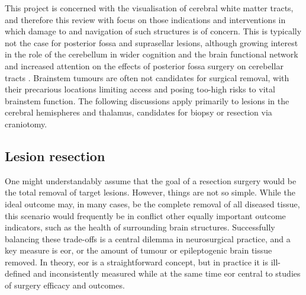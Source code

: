 This project is concerned with the visualisation of cerebral white matter tracts, and therefore this review with focus on those indications and interventions in which damage to and navigation of such structures is of concern.
This is typically not the case for posterior fossa and suprasellar lesions, although growing interest in the role of the cerebellum in wider cognition and the brain functional network and increased attention on the effects of posterior fossa surgery on cerebellar tracts \autocite{Toescu2021,Skye2023}.
Brainstem tumours are often not candidates for surgical removal, with their precarious locations limiting access and posing too-high risks to vital brainstem function.
The following discussions apply primarily to lesions in the cerebral hemispheres and thalamus, candidates for biopsy or resection via craniotomy.

\subsection{Lesion resection}


One might understandably assume that the goal of a resection surgery would be the total removal of target lesions.
However, things are not so simple.
While the ideal outcome may, in many cases, be the complete removal of all diseased tissue, this scenario would frequently be in conflict other equally important outcome indicators, such as the health of surrounding brain structures.
Successfully balancing these trade-offs is a central dilemma in neurosurgical practice, and a key measure is \gls{eor}, or the amount of tumour or epileptogenic brain tissue removed.
In theory, \gls{eor} is a straightforward concept, but in practice it is ill-defined and inconsistently measured while at the same time \gls{eor} central to studies of surgery efficacy and outcomes.

